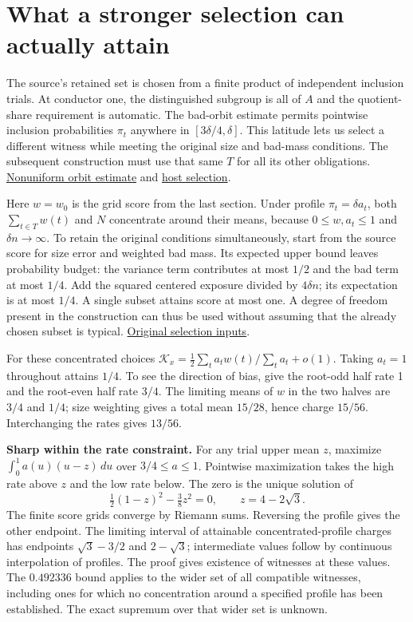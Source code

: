 \documentclass[12pt,letterpaper]{article}
\newcommand{\orig}[3]{\href{https://github.com/nousentllc/riemann-hypothesis/blob/40e56bab026552e089d7afcfeff08d2defb9c005/src/#1.lean\#L#2}{#3}}
\newcommand{\para}[1]{\par\medskip\noindent\textbf{#1}\quad}
\newcommand{\pagepart}[1]{\clearpage\section{#1}}
\begin{document}
\pagepart{What a stronger selection can actually attain}
The source's retained set is chosen from a finite product of independent inclusion trials. At conductor one, the distinguished subgroup is all of \(A\) and the quotient-share requirement is automatic. The bad-orbit estimate permits pointwise inclusion probabilities \(\pi_t\) anywhere in \([3\delta/4,\delta]\). This latitude lets us select a different witness while meeting the original size and bad-mass conditions. The subsequent construction must use that same \(T\) for all its other obligations. \orig{Development/AutomorphicArithmetic/ThickFrames/NotGoodLe}{84}{Nonuniform orbit estimate} and \orig{Development/AutomorphicArithmetic/ShortNorms/hostOfFieldOf}{217}{host selection}.

Here \(w=w_0\) is the grid score from the last section. Under profile \(\pi_t=\delta a_t\), both \(\sum_{t\in T}w(t)\) and \(N\) concentrate around their means, because \(0\le w,a_t\le1\) and \(\delta n\to\infty\). To retain the original conditions simultaneously, start from the source score for size error and weighted bad mass. Its expected upper bound leaves probability budget: the variance term contributes at most \(1/2\) and the bad term at most \(1/4\). Add the squared centered exposure divided by \(4\delta n\); its expectation is at most \(1/4\). A single subset attains score at most one. A degree of freedom present in the construction can thus be used without assuming that the already chosen subset is typical. \orig{Development/AutomorphicArithmetic/ThickFrames/topsGroup}{103}{Original selection inputs}.

For these concentrated choices \(\mathcal K_x=\frac12\sum_ta_tw(t)/\sum_ta_t+o(1)\). Taking \(a_t=1\) throughout attains \(1/4\). To see the direction of bias, give the root-odd half rate 1 and the root-even half rate \(3/4\). The limiting means of \(w\) in the two halves are \(3/4\) and \(1/4\); size weighting gives a total mean \(15/28\), hence charge \(15/56\). Interchanging the rates gives \(13/56\).

\para{Sharp within the rate constraint.} For any trial upper mean \(z\), maximize \(\int_0^1a(u)(u-z)\,du\) over \(3/4\le a\le1\). Pointwise maximization takes the high rate above \(z\) and the low rate below. The zero is the unique solution of
\[
 \tfrac12(1-z)^2-\tfrac38z^2=0,\qquad z=4-2\sqrt3 .
\]
The finite score grids converge by Riemann sums. Reversing the profile gives the other endpoint. The limiting interval of attainable concentrated-profile charges has endpoints \(\sqrt3-3/2\) and \(2-\sqrt3\); intermediate values follow by continuous interpolation of profiles. The proof gives existence of witnesses at these values. The \(0.492336\) bound applies to the wider set of all compatible witnesses, including ones for which no concentration around a specified profile has been established. The exact supremum over that wider set is unknown.
\end{document}
